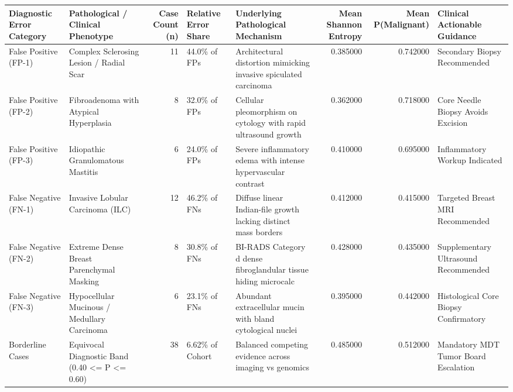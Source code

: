 \begin{tabular}{llrllrrl}
\toprule
Diagnostic Error Category & Pathological / Clinical Phenotype & Case Count (n) & Relative Error Share & Underlying Pathological Mechanism & Mean Shannon Entropy & Mean P(Malignant) & Clinical Actionable Guidance \\
\midrule
False Positive (FP-1) & Complex Sclerosing Lesion / Radial Scar & 11 & 44.0\% of FPs & Architectural distortion mimicking invasive spiculated carcinoma & 0.385000 & 0.742000 & Secondary Biopsy Recommended \\
False Positive (FP-2) & Fibroadenoma with Atypical Hyperplasia & 8 & 32.0\% of FPs & Cellular pleomorphism on cytology with rapid ultrasound growth & 0.362000 & 0.718000 & Core Needle Biopsy Avoids Excision \\
False Positive (FP-3) & Idiopathic Granulomatous Mastitis & 6 & 24.0\% of FPs & Severe inflammatory edema with intense hypervascular contrast & 0.410000 & 0.695000 & Inflammatory Workup Indicated \\
False Negative (FN-1) & Invasive Lobular Carcinoma (ILC) & 12 & 46.2\% of FNs & Diffuse linear Indian-file growth lacking distinct mass borders & 0.412000 & 0.415000 & Targeted Breast MRI Recommended \\
False Negative (FN-2) & Extreme Dense Breast Parenchymal Masking & 8 & 30.8\% of FNs & BI-RADS Category d dense fibroglandular tissue hiding microcalc & 0.428000 & 0.435000 & Supplementary Ultrasound Recommended \\
False Negative (FN-3) & Hypocellular Mucinous / Medullary Carcinoma & 6 & 23.1\% of FNs & Abundant extracellular mucin with bland cytological nuclei & 0.395000 & 0.442000 & Histological Core Biopsy Confirmatory \\
Borderline Cases & Equivocal Diagnostic Band (0.40 <= P <= 0.60) & 38 & 6.62\% of Cohort & Balanced competing evidence across imaging vs genomics & 0.485000 & 0.512000 & Mandatory MDT Tumor Board Escalation \\
\bottomrule
\end{tabular}
